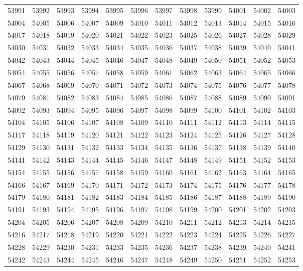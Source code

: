 \begin{center}
\begin{longtable}{llllllllllll}
53991 &53992 &53993 &53994 &53995 &53996 &53997 &53998 &53999 &54001 &54002 &54003 \\
54004 &54005 &54006 &54007 &54009 &54010 &54011 &54012 &54013 &54014 &54015 &54016 \\
54017 &54018 &54019 &54020 &54021 &54022 &54023 &54025 &54026 &54027 &54028 &54029 \\
54030 &54031 &54032 &54033 &54034 &54035 &54036 &54037 &54038 &54039 &54040 &54041 \\
54042 &54043 &54044 &54045 &54046 &54047 &54048 &54049 &54050 &54051 &54052 &54053 \\
54054 &54055 &54056 &54057 &54058 &54059 &54061 &54062 &54063 &54064 &54065 &54066 \\
54067 &54068 &54069 &54070 &54071 &54072 &54073 &54074 &54075 &54076 &54077 &54078 \\
54079 &54081 &54082 &54083 &54084 &54085 &54086 &54087 &54088 &54089 &54090 &54091 \\
54092 &54093 &54094 &54095 &54096 &54097 &54098 &54099 &54100 &54101 &54102 &54103 \\
54104 &54105 &54106 &54107 &54108 &54109 &54110 &54111 &54112 &54113 &54114 &54115 \\
54117 &54118 &54119 &54120 &54121 &54122 &54123 &54124 &54125 &54126 &54127 &54128 \\
54129 &54130 &54131 &54132 &54133 &54134 &54135 &54136 &54137 &54138 &54139 &54140 \\
54141 &54142 &54143 &54144 &54145 &54146 &54147 &54148 &54149 &54151 &54152 &54153 \\
54154 &54155 &54156 &54157 &54158 &54159 &54160 &54161 &54162 &54163 &54164 &54165 \\
54166 &54167 &54169 &54170 &54171 &54172 &54173 &54174 &54175 &54176 &54177 &54178 \\
54179 &54180 &54181 &54182 &54183 &54184 &54185 &54186 &54187 &54188 &54189 &54190 \\
54191 &54193 &54194 &54195 &54196 &54197 &54198 &54199 &54200 &54201 &54202 &54203 \\
54204 &54205 &54206 &54207 &54208 &54209 &54210 &54211 &54212 &54213 &54214 &54215 \\
54216 &54217 &54218 &54219 &54220 &54221 &54222 &54223 &54224 &54225 &54226 &54227 \\
54228 &54229 &54230 &54231 &54233 &54235 &54236 &54237 &54238 &54239 &54240 &54241 \\
54242 &54243 &54244 &54245 &54246 &54247 &54248 &54249 &54250 &54251 &54252 &54253 \\

\end{longtable}
\end{center}
